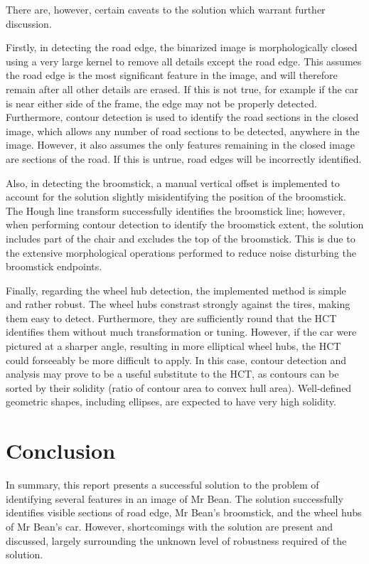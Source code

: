 There are, however, certain caveats to the solution which warrant further discussion.

Firstly, in detecting the road edge, the binarized image is morphologically closed using a very large kernel to remove all details except the road edge. This assumes the road edge is the most significant feature in the image, and will therefore remain after all other details are erased. If this is not true, for example if the car is near either side of the frame, the edge may not be properly detected. Furthermore, contour detection is used to identify the road sections in the closed image, which allows any number of road sections to be detected, anywhere in the image. However, it also assumes the only features remaining in the closed image are sections of the road. If this is untrue, road edges will be incorrectly identified.

Also, in detecting the broomstick, a manual vertical offset is implemented to account for the solution slightly misidentifying the position of the broomstick. The Hough line transform successfully identifies the broomstick line; however, when performing contour detection to identify the broomstick extent, the solution includes part of the chair and excludes the top of the broomstick. This is due to the extensive morphological operations performed to reduce noise disturbing the broomstick endpoints.

Finally, regarding the wheel hub detection, the implemented method is simple and rather robust. The wheel hubs constrast strongly against the tires, making them easy to detect. Furthermore, they are sufficiently round that the HCT identifies them without much transformation or tuning. However, if the car were pictured at a sharper angle, resulting in more elliptical wheel hubs, the HCT could forseeably be more difficult to apply. In this case, contour detection and analysis may prove to be a useful substitute to the HCT, as contours can be sorted by their solidity (ratio of contour area to convex hull area). Well-defined geometric shapes, including ellipses, are expected to have very high solidity.

\section{Conclusion}

In summary, this report presents a successful solution to the problem of identifying several features in an image of Mr Bean. The solution successfully identifies visible sections of road edge, Mr Bean's broomstick, and the wheel hubs of Mr Bean's car. However, shortcomings with the solution are present and discussed, largely surrounding the unknown level of robustness required of the solution.

